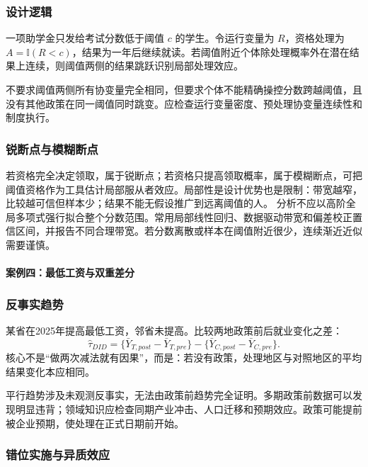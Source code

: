 \subsubsection{设计逻辑}

一项助学金只发给考试分数低于阈值 $c$ 的学生。令运行变量为 $R$，资格处理为 $A=\mathbb I(R<c)$，结果为一年后继续就读。若阈值附近个体除处理概率外在潜在结果上连续，则阈值两侧的结果跳跃识别局部处理效应\parencite{imbenslemieux2008}。

不要求阈值两侧所有协变量完全相同，但要求个体不能精确操控分数跨越阈值，且没有其他政策在同一阈值同时跳变。应检查运行变量密度、预处理协变量连续性和制度执行。

\subsubsection{锐断点与模糊断点}

若资格完全决定领取，属于锐断点；若资格只提高领取概率，属于模糊断点，可把阈值资格作为工具估计局部服从者效应。局部性是设计优势也是限制：带宽越窄，比较越可信但样本少；结果不能无假设推广到远离阈值的人。
分析不应以高阶全局多项式强行拟合整个分数范围。常用局部线性回归、数据驱动带宽和偏差校正置信区间，并报告不同合理带宽。若分数离散或样本在阈值附近很少，连续渐近近似需要谨慎。

\paragraph{案例四：最低工资与双重差分}

\subsubsection{反事实趋势}

某省在2025年提高最低工资，邻省未提高。比较两地政策前后就业变化之差：
\[
\widehat\tau_{DID}=
\{\bar Y_{T,post}-\bar Y_{T,pre}\}
-\{\bar Y_{C,post}-\bar Y_{C,pre}\}.
\]
核心不是“做两次减法就有因果”，而是：若没有政策，处理地区与对照地区的平均结果变化本应相同。

平行趋势涉及未观测反事实，无法由政策前趋势完全证明。多期政策前数据可以发现明显违背；领域知识应检查同期产业冲击、人口迁移和预期效应。政策可能提前被企业预期，使处理在正式日期前开始。

\subsubsection{错位实施与异质效应}

